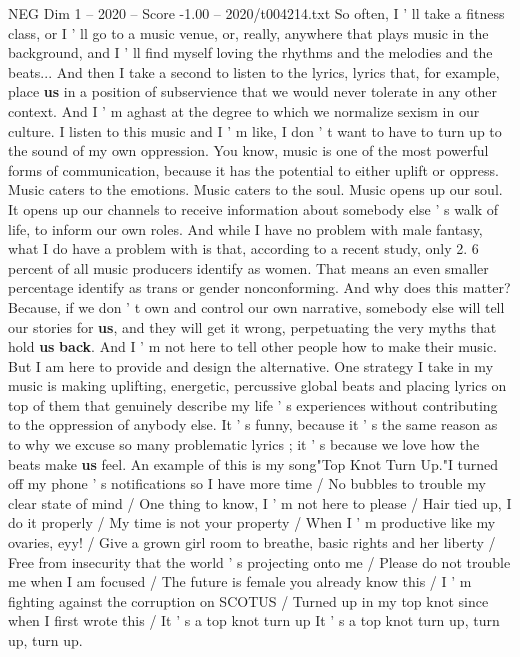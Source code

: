 \begin{textsample}{NEG Dim 1 – 2020 – Score -1.00 – 2020/t004214.txt}  \label{ex:f1_neg_008}
So often, I ' ll take a fitness class, or I ' ll go to a music venue, or, really, anywhere that plays music in the background, and I ' ll find myself loving the rhythms and the melodies and the beats...
And then I take a second to listen to the lyrics, lyrics that, for example, place \textbf{us} in a position of subservience that we would never tolerate in any other context.
And I ' m aghast at the degree to which we normalize sexism in our culture.
I listen to this music and I ' m like, I don ' t want to have to turn up to the sound of my own oppression.
You know, music is one of the most powerful forms of communication, because it has the potential to either uplift or oppress.
Music caters to the emotions.
Music caters to the soul.
Music opens up our soul.
It opens up our channels to receive information about somebody else ' s walk of life, to inform our own roles.
And while I have no problem with male fantasy, what I do have a problem with is that, according to a recent study, only 2. 6 percent of all music producers identify as women.
That means an even smaller percentage identify as trans or gender nonconforming.
And why does this matter?
Because, if we don ' t own and control our own narrative, somebody else will tell our stories for \textbf{us}, and they will get it wrong, perpetuating the very myths that hold \textbf{us} \textbf{back}.
And I ' m not here to tell other people how to make their music.
But I am here to provide and design the alternative.
One strategy I take in my music is making uplifting, energetic, percussive global beats and placing lyrics on top of them that genuinely describe my life ' s experiences without contributing to the oppression of anybody else.
It ' s funny, because it ' s the same reason as to why we excuse so many problematic lyrics ; it ' s because we love how the beats make \textbf{us} feel.
An example of this is my song"Top Knot Turn Up."I turned off my phone ' s notifications so I have more time / No bubbles to trouble my clear state of mind / One thing to know, I ' m not here to please / Hair tied up, I do it properly / My time is not your property / When I ' m productive like my ovaries, eyy! / Give a grown girl room to breathe, basic rights and her liberty / Free from insecurity that the world ' s projecting onto me / Please do not trouble me when I am focused / The future is female you already know this / I ' m fighting against the corruption on SCOTUS / Turned up in my top knot since when I first wrote this / It ' s a top knot turn up It ' s a top knot turn up, turn up, turn up.

\end{textsample}

